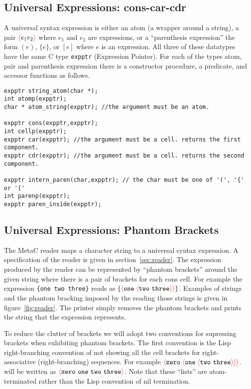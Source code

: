 \documentclass{article}
\newcommand{\mtt}[1]{\mbox{\tt #1}}
\newcommand{\fopen}{{\color{red} \langle}}
\newcommand{\fclose}{{\color{red} \rangle}}
\begin{document}
\subsection{Universal Expressions: cons-car-cdr}

A universal syntax expression is either an atom (a wrapper around a string),
a pair $\fopen e_1 e_2 \fclose$ where $e_1$ and $e_2$ are expressions, or a ``parenthesis expression'' the form $(e)$,
$\{ e\}$, or $[e]$ where $e$ is an expression.   All three of these datatypes have the same C type {\tt expptr} (Expression Pointer).
For each of the types atom, pair and parenthesis expression there is a constructor procedure, a predicate, and accessor functions as follows.

\begin{verbatim}
expptr string_atom(char *);
int atomp(expptr);
char * atom_string(expptr); //the argument must be an atom.

expptr cons(expptr,expptr);
int cellp(expptr);
expptr car(expptr); //the argument must be a cell. returns the first component.
expptr cdr(expptr); //the argument must be a cell. returns the second component.

expptr intern_paren(char,expptr); // the char must be one of '(', '{' or '['
int parenp(expptr);
expptr paren_inside(expptr);
\end{verbatim}

\subsection{Universal Expressions: Phantom Brackets}

The MetaC reader maps a character string to a universal syntax expression.  A specification of the reader is given in section~\ref{sec:reader}.
The expression produced by the reader
can be represented by ``phantom brackets'' around the given string
where there is a pair of brackets for each cons cell.
For example the expression \mtt{\{one two three\}} reads as $\{\fopen \mathtt{one}\;\fopen \mathtt{two~three}\fclose \fclose\}$.
Examples of strings and the phantom bracking imposed by the reading those strings is given in figure~{\ref{fig:reader}}.
The printer simply removes the phantom brackets and prints the string that the expression represents.

To reduce the clutter of brackets we will adopt two conventions for supressing brackets when exhibiting phantom brackets.
The first convention is the Lisp right-branching convention of not showing all the cell brackets for right-associative (right-branching) sequences.
For example $\fopen \mathtt{zero}\;\fopen \mathtt{one}\;\fopen \mathtt{two~three}\fclose \fclose \fclose$.
will be written as $\fopen\mathtt{zero~one~two~three}\fclose$.  Note that these ``lists'' are atom-terminated rather than the Lisp convention of
nil termination.
\end{document}
